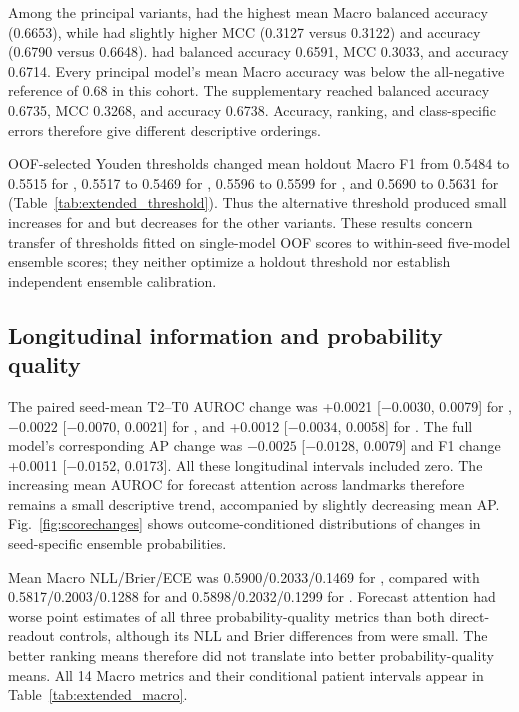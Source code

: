 Among the principal variants, \fullmodel{} had the highest mean Macro balanced accuracy (0.6653), while \direct{} had slightly higher MCC (0.3127 versus 0.3122) and accuracy (0.6790 versus 0.6648). \nojepa{} had balanced accuracy 0.6591, MCC 0.3033, and accuracy 0.6714. Every principal model's mean Macro accuracy was below the all-negative reference of 0.68 in this cohort. The supplementary \meanmodel{} reached balanced accuracy 0.6735, MCC 0.3268, and accuracy 0.6738. Accuracy, ranking, and class-specific errors therefore give different descriptive orderings.

OOF-selected Youden thresholds changed mean holdout Macro F1 from 0.5484 to 0.5515 for \nojepa{}, 0.5517 to 0.5469 for \direct{}, 0.5596 to 0.5599 for \fullmodel{}, and 0.5690 to 0.5631 for \meanmodel{} (Table~\ref{tab:extended_threshold}). Thus the alternative threshold produced small increases for \nojepa{} and \fullmodel{} but decreases for the other variants. These results concern transfer of thresholds fitted on single-model OOF scores to within-seed five-model ensemble scores; they neither optimize a holdout threshold nor establish independent ensemble calibration.

\subsection{Longitudinal information and probability quality}
The paired seed-mean T2--T0 AUROC change was +0.0021 [$-0.0030$, 0.0079] for \fullmodel{}, $-0.0022$ [$-0.0070$, 0.0021] for \nojepa{}, and +0.0012 [$-0.0034$, 0.0058] for \direct{}. The full model's corresponding AP change was $-0.0025$ [$-0.0128$, 0.0079] and F1 change +0.0011 [$-0.0152$, 0.0173]. All these longitudinal intervals included zero. The increasing mean AUROC for forecast attention across landmarks therefore remains a small descriptive trend, accompanied by slightly decreasing mean AP. Fig.~\ref{fig:scorechanges} shows outcome-conditioned distributions of changes in seed-specific ensemble probabilities.


Mean Macro NLL/Brier/ECE was 0.5900/0.2033/0.1469 for \fullmodel{}, compared with 0.5817/0.2003/0.1288 for \direct{} and 0.5898/0.2032/0.1299 for \nojepa{}. Forecast attention had worse point estimates of all three probability-quality metrics than both direct-readout controls, although its NLL and Brier differences from \nojepa{} were small. The better ranking means therefore did not translate into better probability-quality means. All 14 Macro metrics and their conditional patient intervals appear in Table~\ref{tab:extended_macro}.

